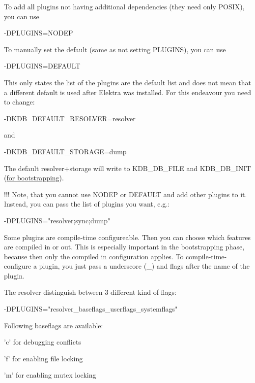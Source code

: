 To add all plugins not having additional dependencies (they need only P\+O\+S\+I\+X), you can use \begin{DoxyVerb}    -DPLUGINS=NODEP
\end{DoxyVerb}


To manually set the default (same as not setting P\+L\+U\+G\+I\+N\+S), you can use \begin{DoxyVerb}    -DPLUGINS=DEFAULT
\end{DoxyVerb}


This only states the list of the plugins are the default list and does not mean that a different default is used after Elektra was installed. For this endeavour you need to change\+: \begin{DoxyVerb}    -DKDB_DEFAULT_RESOLVER=resolver
\end{DoxyVerb}


and \begin{DoxyVerb}    -DKDB_DEFAULT_STORAGE=dump
\end{DoxyVerb}


The default resolver+storage will write to {\ttfamily K\+D\+B\+\_\+\+D\+B\+\_\+\+F\+I\+L\+E} and {\ttfamily K\+D\+B\+\_\+\+D\+B\+\_\+\+I\+N\+I\+T} (\hyperlink{md_doc_help_elektra-bootstrapping_doc_help_elektra-bootstrapping_md}{for bootstrapping}).

!!! Note, that you cannot use N\+O\+D\+E\+P or D\+E\+F\+A\+U\+L\+T and add other plugins to it. Instead, you can pass the list of plugins you want, e.\+g.\+: \begin{DoxyVerb}    -DPLUGINS="resolver;sync;dump"
\end{DoxyVerb}


Some plugins are compile-\/time configureable. Then you can choose which features are compiled in or out. This is especially important in the bootstrapping phase, because then only the compiled in configuration applies. To compile-\/time-\/configure a plugin, you just pass a underscore (\+\_\+) and flags after the name of the plugin.

The resolver distinguish between 3 different kind of flags\+: \begin{DoxyVerb}    -DPLUGINS="resolver_baseflags_userflags_systemflags"
\end{DoxyVerb}


Following baseflags are available\+:


\begin{DoxyItemize}
\item 'c' for debugging conflicts
\item 'f' for enabling file locking
\item 'm' for enabling mutex locking
\end{DoxyItemize}

